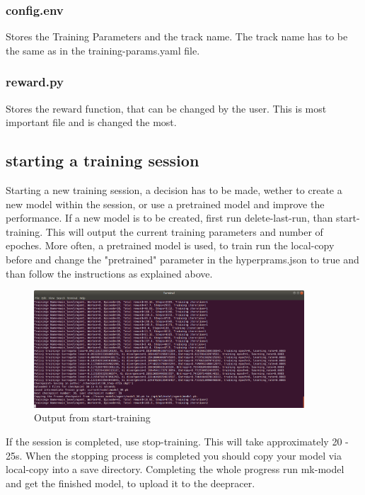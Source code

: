 \subsubsection{config.env}
Stores the Training Parameters and the track name. The track name has to be the same as in the training-params.yaml file.

\subsubsection{reward.py}
Stores the reward function, that can be changed by the user. This is most important file and is changed the most.

\subsection{starting a training session}
Starting a new training session, a decision has to be made, wether to create a new model within the session, or use a pretrained model and improve the performance.
\newline If a new model is to be created, first run delete-last-run, than start-training. This will output the current training parameters and number of epoches.
\newline More often, a pretrained model is used, to train run the local-copy before and change the "pretrained" parameter in the hyperprams.json to true and than follow the instructions as explained above.

\begin{figure}[H]
    \centering
    \includegraphics[width=0.9\textwidth]{images/deepracer_local_session1_1_console.png}
    \caption[]{Output from start-training\footnotemark}
    \label{fig:console-output-start}
\end{figure}

If the session is completed, use stop-training. This will take approximately 20 - 25s. When the stopping process is completed you should copy your model via local-copy into a save directory. Completing the whole progress run mk-model and get the finished model, to upload it to the deepracer.

